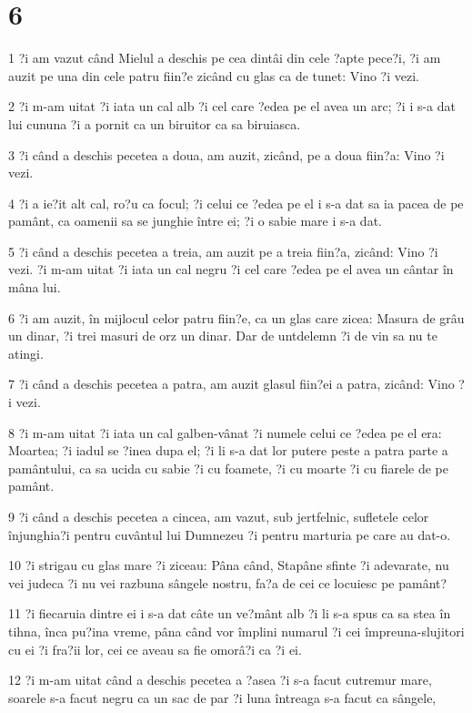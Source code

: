 \chapter{6}

\par 1 ?i am vazut când Mielul a deschis pe cea dintâi din cele ?apte pece?i, ?i am auzit pe una din cele patru fiin?e zicând cu glas ca de tunet: Vino ?i vezi.
\par 2 ?i m-am uitat ?i iata un cal alb ?i cel care ?edea pe el avea un arc; ?i i s-a dat lui cununa ?i a pornit ca un biruitor ca sa biruiasca.
\par 3 ?i când a deschis pecetea a doua, am auzit, zicând, pe a doua fiin?a: Vino ?i vezi.
\par 4 ?i a ie?it alt cal, ro?u ca focul; ?i celui ce ?edea pe el i s-a dat sa ia pacea de pe pamânt, ca oamenii sa se junghie între ei; ?i o sabie mare i s-a dat.
\par 5 ?i când a deschis pecetea a treia, am auzit pe a treia fiin?a, zicând: Vino ?i vezi. ?i m-am uitat ?i iata un cal negru ?i cel care ?edea pe el avea un cântar în mâna lui.
\par 6 ?i am auzit, în mijlocul celor patru fiin?e, ca un glas care zicea: Masura de grâu un dinar, ?i trei masuri de orz un dinar. Dar de untdelemn ?i de vin sa nu te atingi.
\par 7 ?i când a deschis pecetea a patra, am auzit glasul fiin?ei a patra, zicând: Vino ?i vezi.
\par 8 ?i m-am uitat ?i iata un cal galben-vânat ?i numele celui ce ?edea pe el era: Moartea; ?i iadul se ?inea dupa el; ?i li s-a dat lor putere peste a patra parte a pamântului, ca sa ucida cu sabie ?i cu foamete, ?i cu moarte ?i cu fiarele de pe pamânt.
\par 9 ?i când a deschis pecetea a cincea, am vazut, sub jertfelnic, sufletele celor înjunghia?i pentru cuvântul lui Dumnezeu ?i pentru marturia pe care au dat-o.
\par 10 ?i strigau cu glas mare ?i ziceau: Pâna când, Stapâne sfinte ?i adevarate, nu vei judeca ?i nu vei razbuna sângele nostru, fa?a de cei ce locuiesc pe pamânt?
\par 11 ?i fiecaruia dintre ei i s-a dat câte un ve?mânt alb ?i li s-a spus ca sa stea în tihna, înca pu?ina vreme, pâna când vor împlini numarul ?i cei împreuna-slujitori cu ei ?i fra?ii lor, cei ce aveau sa fie omorâ?i ca ?i ei.
\par 12 ?i m-am uitat când a deschis pecetea a ?asea ?i s-a facut cutremur mare, soarele s-a facut negru ca un sac de par ?i luna întreaga s-a facut ca sângele,
